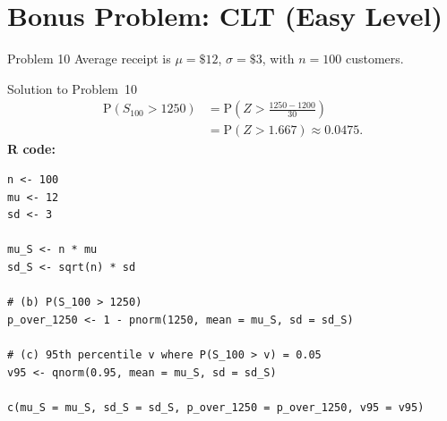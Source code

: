 \documentclass[12pt,a4paper]{article}
\renewcommand{\P}{\mathrm{P}}
\begin{document}
\bigskip
\section*{\color{kseblue}Bonus Problem: CLT (Easy Level)}

\begin{problembox}{Problem 10}
Average receipt is $\mu=\$12$, $\sigma=\$3$, with $n=100$ customers.
\end{problembox}

\begin{solutionbox}{Solution to Problem~10}
\[
\begin{aligned}
\P(S_{100}>1250)
&=\P\!\left(Z>\frac{1250-1200}{30}\right)\\
&=\P(Z>1.667)\approx0.0475.
\end{aligned}
\]
\textbf{R code:}
\begin{lstlisting}[style=rcode]
n <- 100
mu <- 12
sd <- 3

mu_S <- n * mu
sd_S <- sqrt(n) * sd

# (b) P(S_100 > 1250)
p_over_1250 <- 1 - pnorm(1250, mean = mu_S, sd = sd_S)

# (c) 95th percentile v where P(S_100 > v) = 0.05
v95 <- qnorm(0.95, mean = mu_S, sd = sd_S)

c(mu_S = mu_S, sd_S = sd_S, p_over_1250 = p_over_1250, v95 = v95)
\end{lstlisting}
\end{solutionbox}
\end{document}
